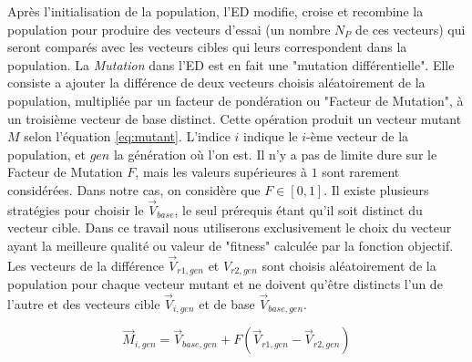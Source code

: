 Après l'initialisation de la population, l'ED modifie, croise et recombine la population pour produire des vecteurs d'essai (un nombre $N_P$ de ces vecteurs) qui seront comparés avec les vecteurs cibles qui leurs correspondent dans la population. La \textit{Mutation} dans l'ED est en fait une "mutation différentielle". Elle consiste a ajouter la différence de deux vecteurs choisis aléatoirement de la population, multipliée par un facteur de pondération ou "Facteur de Mutation", à un troisième vecteur de base distinct. Cette opération produit un vecteur mutant $M$ selon l'équation \ref{eq:mutant}. L'indice $i$ indique le $i$-ème vecteur de la population, et $gen$ la génération où l'on est. 
Il n'y a pas de limite dure sur le Facteur de Mutation $F$, mais les valeurs supérieures à $1$ sont rarement considérées. Dans notre cas, on considère que $F \in [0, 1]$. Il existe plusieurs stratégies pour choisir le $\vec{V}_{base}$, le seul prérequis étant qu'il soit distinct du vecteur cible. Dans ce travail nous utiliserons exclusivement le choix du vecteur ayant la meilleure qualité ou valeur de "fitness" calculée par la fonction objectif. Les vecteurs de la différence $\vec{V}_{r1,gen}$ et $V_{r2,gen}$ sont choisis aléatoirement de la population pour chaque vecteur mutant et ne doivent qu'être distincts l'un de l'autre et des vecteurs cible $\vec{V}_{i, gen}$ et de base $\vec{V}_{base, gen}$.

\begin{equation}
  \label{eq:mutant}
  \vec{M}_{i,gen} = \vec{V}_{base,gen} + F (\vec{V}_{r1,gen} - \vec{V}_{r2,gen})  
\end{equation}

